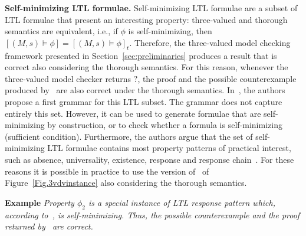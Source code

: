 \vskip 0.05in  
\textbf{Self-minimizing LTL formulae.} 
Self-minimizing LTL formulae are a subset of LTL formulae that present an interesting property:  three-valued and  thorough semantics are equivalent, i.e., if $\phi$ is self-minimizing, then $[(M, s) \models \phi]=[(M, s) \models \phi]_t$.
Therefore, the three-valued model checking framework presented in Section~\ref{sec:preliminaries} produces a result that is correct also considering the thorough semantics. 
For this reason, whenever the three-valued model checker returns $?$,  the proof and the possible counterexample produced by \NAME\ are also correct  under the thorough semantics. In~\cite{godefroid2005MCvsGMC}, the authors propose a first grammar for this LTL subset. 
The grammar does not capture entirely this set. However, it can be used to generate formulae that are self-minimizing by construction, or to check whether a formula is self-minimizing (sufficient condition). 
Furthermore, the authors argue that the set of self-minimizing LTL formulae contains most property patterns of practical interest, such as absence, universality, existence, response and response chain~\cite{dwyer1998property}. 
For these reasons it is  possible in practice to use the version of \NAME\ of Figure~\ref{Fig.3vdvinstance} also considering the thorough semantics.


\textbf{Example}
\emph{Property $\phi_2$ is a special instance of LTL response pattern which, according to~\cite{godefroid2005MCvsGMC}, is self-minimizing.
Thus, the possible counterexample and the proof returned by \NAME\ are correct.}